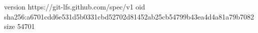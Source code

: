 version https://git-lfs.github.com/spec/v1
oid sha256:a6701cdd6e531d5b0331cbd52702d81452ab25cb54799b43ea4d4a81a79b7082
size 54701
